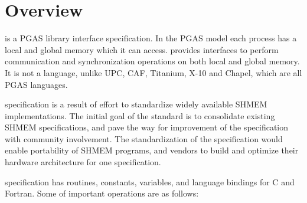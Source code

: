 \section{Overview}
\openshmem{} is a PGAS library interface specification. In the PGAS model each process has a local and 
global memory which it can access. \openshmem{} provides interfaces to 
perform communication and synchronization operations on both local and global memory. 
It is not a language, unlike UPC, CAF, Titanium, X-10 and Chapel, which are all
PGAS languages.

\openshmem{} specification is a result of effort to standardize widely available SHMEM implementations. 
The initial goal of the standard is to consolidate existing SHMEM specifications, and  pave the way for 
improvement of the specification with community involvement. The standardization of the specification 
would enable portability of SHMEM programs, and  vendors to build and optimize their hardware 
architecture for one specification.

\openshmem{} specification has routines, constants, variables, and language bindings for C and Fortran.
Some of important \openshmem{} operations are as follows:

